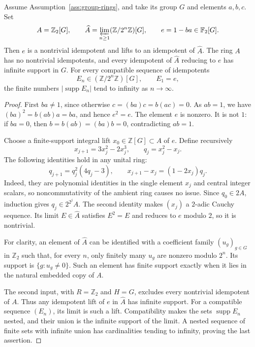 \begin{proposition}
\label{prop:adic-support}
Assume Assumption~\ref{ass:group-rings}, and take its group $G$ and elements
$a,b,c$.  Set
\[
 A=\mathbb Z_2[G],\qquad
 \widehat A=\varprojlim_{n\geq1}(\mathbb Z/2^n\mathbb Z)[G],
 \qquad e=1-ba\in\mathbb F_2[G].
\]
Then $e$ is a nontrivial idempotent and lifts to an idempotent of
$\widehat A$.  The ring $A$ has no nontrivial idempotents, and every
idempotent of $\widehat A$ reducing to $e$ has infinite support in $G$.
For every compatible sequence of idempotents
\[
 E_n\in(\mathbb Z/2^n\mathbb Z)[G],\qquad E_1=e,
\]
the finite numbers $|\operatorname{supp}E_n|$ tend to infinity as
$n\to\infty$.
\end{proposition}

\begin{proof}
First $ba\neq 1$, since otherwise
$c=(ba)c=b(ac)=0$.  As $ab=1$, we have $(ba)^2=b(ab)a=ba$, and hence
$e^2=e$.  The element $e$ is nonzero.  It is not $1$: if $ba=0$, then
$b=b(ab)=(ba)b=0$, contradicting $ab=1$.

Choose a finite-support integral lift $x_0\in\mathbb Z[G]\subset A$ of
$e$.  Define recursively
\[
 x_{j+1}=3x_j^2-2x_j^3,\qquad q_j=x_j^2-x_j.
\]
The following identities hold in any unital ring:
\[
 q_{j+1}=q_j^2(4q_j-3),\qquad
 x_{j+1}-x_j=(1-2x_j)q_j.
\]
Indeed, they are polynomial identities in the single element $x_j$ and
central integer scalars, so noncommutativity of the ambient ring causes
no issue.  Since $q_0\in2A$, induction gives
$q_j\in2^{2^j}A$.  The second identity makes $(x_j)$ a $2$-adic Cauchy
sequence.  Its limit $E\in\widehat A$ satisfies $E^2=E$ and reduces to
$e$ modulo $2$, so it is nontrivial.

For clarity, an element of $\widehat A$ can be identified with a
coefficient family $(u_g)_{g\in G}$ in $\mathbb Z_2$ such that, for every
$n$, only finitely many $u_g$ are nonzero modulo $2^n$.  Its support is
$\{g:u_g\neq0\}$.  Such an element has finite support exactly when it
lies in the natural embedded copy of $A$.

The second input, with $R=\mathbb Z_2$ and $H=G$, excludes every
nontrivial idempotent of $A$.  Thus any idempotent lift of $e$ in
$\widehat A$ has infinite support.  For a compatible sequence $(E_n)$,
its limit is such a lift.  Compatibility makes the sets
$\operatorname{supp}E_n$ nested, and their union is the infinite support
of the limit.  A nested sequence of finite sets with infinite union has
cardinalities tending to infinity, proving the last assertion.
\end{proof}

